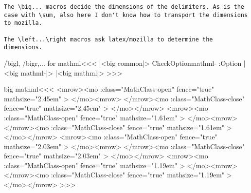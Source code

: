 {{{{{{\begin{verbatim}
The \big... macros decide the dimensions of the delimiters. As is the
case with \sum, also here I don't know how to transport the dimensions
to mozilla.

The \left...\right macros ask latex/mozilla to determine the
dimensions.
\end{verbatim}



\</bigl, /bigr,... for mathml\><<<
|<big common|>
\:CheckOption{mathml-}     \if:Option 
   |<big mathml-|>
\else
   |<big mathml|>
\fi
>>>

\<big mathml\><<<
   {\bgroup
          {<mrow><mo \mml:class="MathClass-open" 
                     fence="true" mathsize="2.45em" >}
          {</mo><mrow>}
          {}%
   }
   {\egroup}
   {\bgroup
          {</mrow><mo \mml:class="MathClass-close"
                     fence="true" mathsize="2.45em" >}
          {</mo></mrow>}
          {}%
   }
   {\egroup}
   {\bgroup
          {<mrow><mo \mml:class="MathClass-open"
                     fence="true" mathsize="1.61em" >}
          {</mo><mrow>}
          {}%
   }
   {\egroup}
   {\bgroup
          {</mrow><mo \mml:class="MathClass-close"
                     fence="true" mathsize="1.61em" >}
          {</mo></mrow>}
          {}%
   }
   {\egroup}
   {\bgroup
          {<mrow><mo \mml:class="MathClass-open"
                     fence="true" mathsize="2.03em" >}
          {</mo><mrow>}
          {}%
   }
   {\egroup}
   {\bgroup
          {</mrow><mo \mml:class="MathClass-close"
                     fence="true" mathsize="2.03em" >}
          {</mo></mrow>}
          {}%
   }
   {\egroup}
   {\bgroup
          {<mrow><mo \mml:class="MathClass-open"
                     fence="true" mathsize="1.19em" >}
          {</mo><mrow>}
          {}%
   }
   {\egroup}
   {\bgroup
          {</mrow><mo \mml:class="MathClass-close"
                     fence="true" mathsize="1.19em" >}
          {</mo></mrow>}
          {}%
   }
   {\egroup}
>>>




}}}}}}

